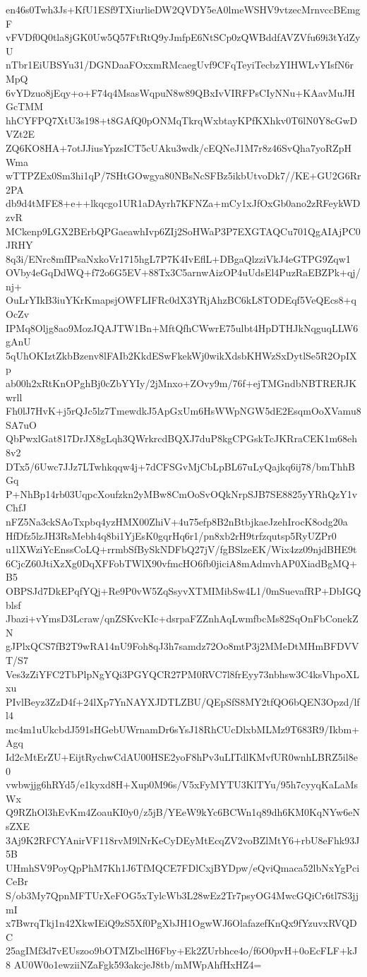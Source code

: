 en46s0Twh3Js+KfU1ESf9TXiurlieDW2QVDY5eA0lmeWSHV9vtzecMrnvccBEmgF
vFVDf0Q0tla8jGK0Uw5Q57FtRtQ9yJmfpE6NtSCp0zQWBddfAVZVfu69i3tYdZyU
nTbr1EiUBSYu31/DGNDaaFOxxmRMcaegUvf9CFqTeyiTecbzYIHWLvYIsfN6rMpQ
6vYDzuo8jEqy+o+F74q4MsasWqpuN8w89QBxIvVIRFPsCIyNNu+KAavMuJHGcTMM
hhCYFPQ7XtU3s198+t8GAfQ0pONMqTkrqWxbtayKPfKXhkv0T6lN0Y8cGwDVZt2E
ZQ6KO8HA+7otJJiusYpzsICT5cUAku3wdk/cEQNeJ1M7r8z46SvQha7yoRZpHWma
wTTPZEx0Sm3hi1qP/7SHtGOwgya80NBsNcSFBz5ikbUtvoDk7//KE+GU2G6Rr2PA
db9d4tMFE8+e++lkqcgo1UR1aDAyrh7KFNZa+mCy1xJfOxGb0ano2zRFeykWDzvR
MCkenp9LGX2BErbQPGaeawhIvp6ZIj2SoHWaP3P7EXGTAQCu701QgAIAjPC0JRHY
8q3i/ENrc8mfIPsaNxkoVr1715hgL7P7K4IvEflL+DBgaQlzziVkJ4eGTPG9Zqw1
OVby4eGqDdWQ+f72o6G5EV+88Tx3C5arnwAizOP4uUdsEl4PuzRaEBZPk+qj/nj+
OuLrYIkB3iuYKrKmapsjOWFLIFRc0dX3YRjAhzBC6kL8TODEqf5VeQEcs8+qOcZv
IPMq8Oljg8ao9MozJQAJTW1Bn+MftQfhCWwrE75ulbt4HpDTHJkNqguqLLW6gAnU
5qUhOKIztZkbBzenv8lFAIb2KkdESwFkekWj0wikXdsbKHWzSxDytlSe5R2OpIXp
ab00h2xRtKnOPghBj0cZbYYIy/2jMnxo+ZOvy9m/76f+ejTMGndbNBTRERJKwrll
Fh0lJ7HvK+j5rQJc5lz7TmewdkJ5ApGxUm6HsWWpNGW5dE2EsqmOoXVamu8SA7uO
QbPwxlGat817DrJX8gLqh3QWrkrcdBQXJ7duP8kgCPGskTcJKRraCEK1m68eh8v2
DTx5/6Uwc7JJz7LTwhkqqw4j+7dCFSGvMjCbLpBL67uLyQajkq6ij78/bmThhBGq
P+NhBp14rb03UqpcXoufzkn2yMBw8CmOoSvOQkNrpSJB7SE8825yYRhQzY1vChfJ
nFZ5Na3ckSAoTxpbq4yzHMX00ZhiV+4u75efp8B2nBtbjkaeJzehIrocK8odg20a
HfDfz5lzJH3RsMebh4q8bi1YjEsK0gqrHq6r1/pn8xb2rH9trfzqutsp5RyUZPr0
u1lXWziYcEnssCoLQ+rrmbSfBySkNDFbQ27jV/fgBSlzeEK/Wix4zz09njdBHE9t
6CjcZ60JtiXzXg0DqXFFobTWlX90vfmcHO6fb0jiciA8mAdmvhAP0XiadBgMQ+B5
OBPSJd7DkEPqfYQj+Re9P0vW5ZqSsyvXTMIMibSw4L1/0mSuevafRP+DbIGQblsf
Jbazi+vYmsD3Lcraw/qnZSKvcKIc+dsrpaFZZnhAqLwmfbcMs82SqOnFbConekZN
gJPlxQCS7fB2T9wRA14nU9Foh8qJ3h7samdz72Oo8mtP3j2MMeDtMHmBFDVVT/S7
Ves3zZiYFC2TbPlpNgYQi3PGYQCR27PM0RVC7l8frEyy73nbhsw3C4ksVhpoXLxu
PIvlBeyz3ZzD4f+24lXp7YnNAYXJDTLZBU/QEpSfS8MY2tfQO6bQEN3Opzd/lfl4
mc4m1uUkcbdJ591sHGebUWrnamDr6sYsJ18RhCUcDlxbMLMz9T683R9/Ikbm+Agq
Id2cMtErZU+EijtRychwCdAU00HSE2yoF8hPv3uLITdlKMvfUR0wnhLBRZ5il8e0
vwbwjjg6hRYd5/e1kyxd8H+Xup0M96s/V5xFyMYTU3KlTYu/95h7cyyqKaLaMsWx
Q9RZhOl3hEvKm4ZoauKI0y0/z5jB/YEeW9kYc6BCWn1q89dh6KM0KqNYw6eNsZXE
3Aj9K2RFCYAnirVF118rvM9lNrKeCyDEyMtEcqZV2voBZlMtY6+rbU8eFhk93J5B
UHmhSV9PoyQpPhM7Kh1J6TfMQCE7FDlCxjBYDpw/eQviQmaca52lbNxYgPciCeBr
S/ob3My7QpnMFTUrXeFOG5xTylcWb3L28wEz2Tr7psyOG4MwcGQiCr6tl7S3jjmI
x7BwrqTkj1n42XkwIEiQ9zS5Xf0PgXbJH1OgwWJ6OlafazefKnQx9fYzuvxRVQDC
25agIMf3d7vEUszoo9bOTMZbclH6Fby+Ek2ZUrbhce4o/f6O0pvH+0oEcFLF+kJ8
AU0W0o1ewziiNZaFgk593akcjeJ8tb/mMWpAhfHxHZ4=

